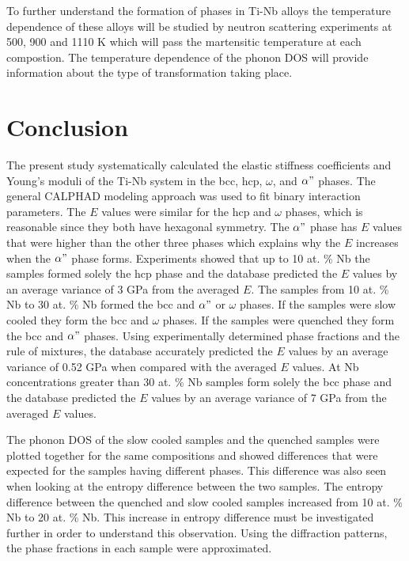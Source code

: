 To further understand the formation of phases in Ti-Nb alloys the temperature dependence of these alloys will be studied by neutron scattering experiments at 500, 900 and 1110 K which will pass the martensitic temperature at each compostion. The temperature dependence of the phonon DOS will provide information about the type of transformation taking place.

\section{Conclusion}

The present study systematically calculated the elastic stiffness coefficients and Young's moduli of the Ti-Nb system in the bcc, hcp, $\omega$, and $\alpha"$ phases. The general CALPHAD modeling approach was used to fit binary interaction parameters. The $E$ values were similar for the hcp and $\omega$ phases, which is reasonable since they both have hexagonal symmetry. The $\alpha"$ phase has $E$ values that were higher than the other three phases which explains why the $E$ increases when the $\alpha"$ phase forms. Experiments showed that up to 10 at. \% Nb the samples formed solely the hcp phase and the database predicted the $E$ values by an average variance of 3 GPa from the averaged $E$. The samples from 10 at. \% Nb to 30 at. \% Nb formed the bcc and $\alpha"$ or $\omega$ phases. If the samples were slow cooled they form the bcc and $\omega$ phases. If the samples were quenched they form the bcc and $\alpha"$ phases. Using experimentally determined phase fractions and the rule of mixtures, the database accurately predicted the $E$ values by an average variance of 0.52 GPa when compared with the averaged $E$ values. At Nb concentrations greater than 30 at. \% Nb samples form solely the bcc phase and the database predicted the $E$ values by an average variance of 7 GPa from the averaged $E$ values. 

The phonon DOS of the slow cooled samples and the quenched samples were plotted together for the same compositions and showed differences that were expected for the samples having different phases. This difference was also seen when looking at the entropy difference between the two samples. The entropy difference between the quenched and slow cooled samples increased from 10 at. \% Nb to 20 at. \% Nb. This increase in entropy difference must be investigated further in order to understand this observation. Using the diffraction patterns, the phase fractions in each sample were approximated. 

